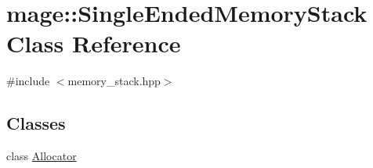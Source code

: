 \hypertarget{classmage_1_1_single_ended_memory_stack}{}\section{mage\+:\+:Single\+Ended\+Memory\+Stack Class Reference}
\label{classmage_1_1_single_ended_memory_stack}


{\ttfamily \#include $<$memory\+\_\+stack.\+hpp$>$}

\subsection*{Classes}
\begin{DoxyCompactItemize}
\item 
class \mbox{\hyperlink{classmage_1_1_single_ended_memory_stack_1_1_allocator}{Allocator}}
\end{DoxyCompactItemize}
